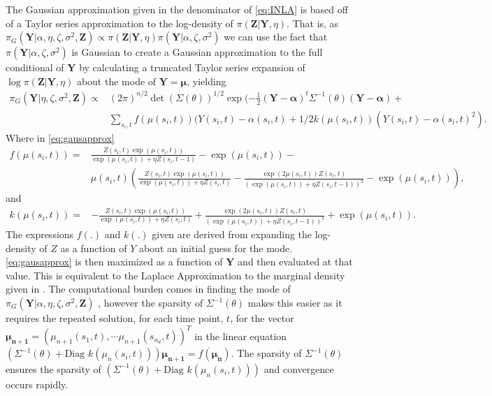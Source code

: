 \documentclass[11pt]{isuthesis}
\begin{document}
	The Gaussian approximation given in the denominator of \eqref{eq:INLA} is based off of a Taylor series approximation to the log-density of $\pi(\boldsymbol{Z}|\boldsymbol{Y},\eta)$.  That is, as $\pi_G(\boldsymbol{Y}|\alpha,\eta,\zeta,\sigma^2,\boldsymbol{Z})\propto\pi(\boldsymbol{Z}|\boldsymbol{Y},\eta)\pi(\boldsymbol{Y}|\alpha,\zeta,\sigma^2)$ we can use the fact that $\pi(\boldsymbol{Y}|\alpha,\zeta,\sigma^2)$ is Gaussian to create a Gaussian approximation to the full conditional of $\boldsymbol{Y}$ by calculating a truncated Taylor series expansion of $\log\pi(\boldsymbol{Z}|\boldsymbol{Y},\eta)$ about the mode of $\boldsymbol{Y}=\boldsymbol{\mu}$, yielding
	\begin{align}
	\pi_G(\boldsymbol{Y}|\eta,\zeta,\sigma^2,\boldsymbol{Z}) \propto& (2 \pi)^{n/2} \det(\Sigma(\theta))^{1/2} \exp(-\frac{1}{2}(\boldsymbol{Y}-\boldsymbol{\alpha})^t \Sigma^{-1}(\theta)(\boldsymbol{Y}-\boldsymbol{\alpha})+\nonumber \\&\sum_{s_i,t} f(\mu(s_i,t))(Y(s_i,t)-\alpha(s_i,t)+
	\label{eq:gausapprox} 1/2 k (\mu(s_i,t))(Y(s_i,t)-\alpha(s_i,t)^2).
	\end{align} 
	Where in \eqref{eq:gausapprox}
	{\small
	\begin{align}
	f(\mu(s_i,t))  =& \frac{Z(s_i,t)\exp(\mu(s_i,t))}{\exp(\mu(s_i,t))+\eta Z(s_i,t-1)}-\exp(\mu(s_i,t)) - \nonumber \\       & \mu(s_i,t)\left(\frac{Z(s_i,t)\exp(\mu(s_i,t))}{\exp(\mu(s_i,t))+\eta Z(s_i,t)}-\frac{\exp(2 \mu(s_i,t))Z(s_i,t)}{\left(\exp(\mu(s_i,t))+\eta Z(s_i,t-1)\right)^2}-\exp(\mu(s_i,t))\right),
	\end{align}
	}%
	and
	\begin{align}
	k(\mu(s_i,t)) =& -\frac{Z(s_i,t)\exp(\mu(s_i,t))}{\exp(\mu(s_i,t))+\eta Z(s_i,t)}+\frac{\exp(2 \mu(s_i,t))Z(s_i,t)}{\left(\exp(\mu(s_i,t))+\eta Z(s_i,t-1)\right)^2}+\exp(\mu(s_i,t)). 
	\end{align}
	The expressions $f(.)$ and $k(.)$ given are derived from expanding the log-density of $Z$ as a function of $Y$ about an initial guess for the mode. \eqref{eq:gausapprox} is then maximized as a function of $\boldsymbol{Y}$ and then evaluated at that value.  This is equivalent to the Laplace Approximation to the marginal density given in \cite{tierney1986accurate}.  The computational burden comes in finding the mode of $\pi_G(\boldsymbol{Y}|\alpha,\eta,\zeta,\sigma^2,\boldsymbol{Z})$ , however the sparsity of $\Sigma^{-1}(\theta)$ makes this easier as it requires the repeated solution, for each time point, $t$, for the vector $\boldsymbol{\mu_{n+1}}=(\mu_{n+1}(s_1,t),\cdots\mu_{n+1}(s_{n_d},t))^T$ in the linear equation $\left(\Sigma^{-1}(\theta)+\mbox{Diag }k(\mu_n(s_i,t))\right)\boldsymbol{\mu_{n+1}} = f(\boldsymbol{\mu_n})$.  The sparsity of $\Sigma^{-1}(\theta)$ ensures the sparsity of $\left(\Sigma^{-1}(\theta)+\mbox{Diag }k(\mu_n(s_i,t))\right)$ and convergence occurs rapidly.
	
\end{document}
